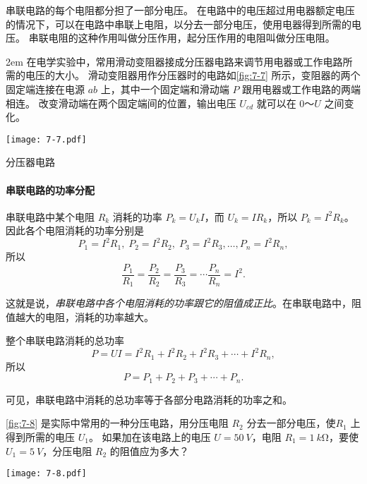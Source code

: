 串联电路的每个电阻都分担了一部分电压。
在电路中的电压超过用电器额定电压的情况下，可以在电路中串联上电阻，以分去一部分电压，使用电器得到所需的电压。
串联电阻的这种作用叫做分压作用，起分压作用的电阻叫做分压电阻。

\medskip\noindent
\begin{minipage}{0.65\linewidth}\parindent2em
在电学实验中，常用滑动变阻器接成分压器电路来调节用电器或工作电路所需的电压的大小。
滑动变阻器用作分压器时的电路如\cref{fig:7-7} 所示，变阻器的两个固定端连接在电源 $ab$ 上，其中一个固定端和滑动端 $P$ 跟用电器或工作电路的两端相连。
改变滑动端在两个固定端间的位置，输出电压 $U_{cd}$ 就可以在 0～$U$ 之间变化。
\end{minipage}\hfill
\begin{minipage}{0.3\linewidth}\centering
  \begin{figurehere}
    \texttt{[image: 7-7.pdf]}
    \caption{分压器电路}\label{fig:7-7}
  \end{figurehere}
\end{minipage}

\medskip
\paragraph{串联电路的功率分配} 串联电路中某个电阻 $R_k$ 消耗的功率 $P_k=U_kI$，而 $U_k=IR_k$，所以 $P_k=I^2R_k$。
因此各个电阻消耗的功率分别是
\[P_1=I^2R_1,\; P_2=I^2R_2,\; P_3=I^2R_3,\ldots, P_n=I^2R_n,\]
所以
\[\frac{P_1}{R_1}=\frac{P_2}{R_2}=\frac{P_3}{R_3}=\cdots\frac{P_n}{R_n}=I^2.\]

这就是说，\emph{串联电路中各个电阻消耗的功率跟它的阻值成正比}。在串联电路中，阻值越大的电阻，消耗的功率越大。

整个串联电路消耗的总功率
\[P=UI=I^2R_1 +I^2R_2+I^2R_3+\cdots+I^2R_n,\]
所以
\[P=P_1+P_2+P_3+\cdots +P_n.\]

可见，串联电路中消耗的总功率等于各部分电路消耗的功率之和。

\bigskip\noindent
\begin{minipage}{0.55\linewidth}
\begin{example}
  \cref{fig:7-8} 是实际中常用的一种分压电路，用分压电阻 $R_2$ 分去一部分电压，使$R_1$ 上得到所需的电压 $U_1$。
  如果加在该电路上的电压 $U=\qty{50}{V}$，电阻 $R_1=\qty{1}{k\ohm}$，要使 $U_1=\qty{5}{V}$，分压电阻 $R_2$ 的阻值应为多大？
\end{example}
\end{minipage}\hfill
\begin{minipage}{0.4\linewidth}\centering
  \begin{figurehere}
    \texttt{[image: 7-8.pdf]}
    \caption{}\label{fig:7-8}
  \end{figurehere}
\end{minipage}

